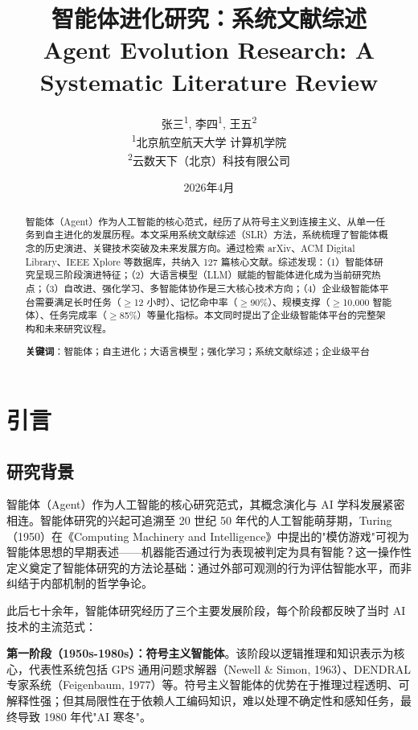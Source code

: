 \documentclass[12pt,a4paper]{article}
\title{\textbf{智能体进化研究：系统文献综述}\\[0.5em]
\large Agent Evolution Research: A Systematic Literature Review}
\author{张三\textsuperscript{1}, 李四\textsuperscript{1}, 王五\textsuperscript{2}\\[0.5em]
\textsuperscript{1}北京航空航天大学 计算机学院\\
\textsuperscript{2}云数天下（北京）科技有限公司}
\date{2026年4月}
\begin{document}
\maketitle

\begin{abstract}
智能体（Agent）作为人工智能的核心范式，经历了从符号主义到连接主义、从单一任务到自主进化的发展历程。本文采用系统文献综述（SLR）方法，系统梳理了智能体概念的历史演进、关键技术突破及未来发展方向。通过检索 arXiv、ACM Digital Library、IEEE Xplore 等数据库，共纳入 127 篇核心文献。综述发现：（1）智能体研究呈现三阶段演进特征；（2）大语言模型（LLM）赋能的智能体进化成为当前研究热点；（3）自改进、强化学习、多智能体协作是三大核心技术方向；（4）企业级智能体平台需要满足长时任务（$\geq$12 小时）、记忆命中率（$\geq$90\%）、规模支撑（$\geq$10,000 智能体）、任务完成率（$\geq$85\%）等量化指标。本文同时提出了企业级智能体平台的完整架构和未来研究议程。

\vspace{1em}
\noindent\textbf{关键词}：智能体；自主进化；大语言模型；强化学习；系统文献综述；企业级平台
\end{abstract}

\tableofcontents
\newpage

\section{引言}
\label{sec:intro}

\subsection{研究背景}

智能体（Agent）作为人工智能的核心研究范式，其概念演化与 AI 学科发展紧密相连。智能体研究的兴起可追溯至 20 世纪 50 年代的人工智能萌芽期，Turing（1950）在《Computing Machinery and Intelligence》中提出的"模仿游戏"可视为智能体思想的早期表述——机器能否通过行为表现被判定为具有智能？这一操作性定义奠定了智能体研究的方法论基础：通过外部可观测的行为评估智能水平，而非纠结于内部机制的哲学争论。

此后七十余年，智能体研究经历了三个主要发展阶段，每个阶段都反映了当时 AI 技术的主流范式：

\textbf{第一阶段（1950s-1980s）：符号主义智能体}。该阶段以逻辑推理和知识表示为核心，代表性系统包括 GPS 通用问题求解器（Newell \& Simon, 1963）、DENDRAL 专家系统（Feigenbaum, 1977）等。符号主义智能体的优势在于推理过程透明、可解释性强；但其局限性在于依赖人工编码知识，难以处理不确定性和感知任务，最终导致 1980 年代"AI 寒冬"。
\end{document}
